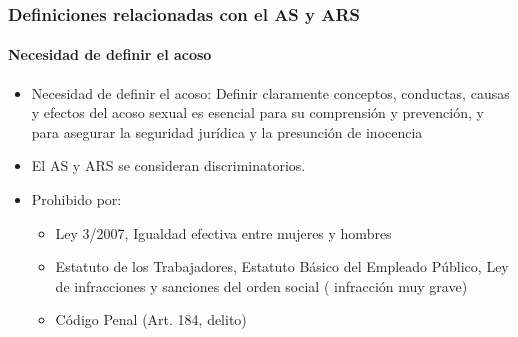 \documentclass{beamer}
\newcommand{\highlight}[1]{{\color{Blue} #1}}
\begin{document}
    \begin{frame}
        \frametitle{Definiciones relacionadas con el AS y ARS}
        \framesubtitle{Necesidad de definir el acoso}
        \begin{itemize}
            \item \highlight{Necesidad de definir} el acoso: Definir claramente conceptos, conductas, causas y efectos del acoso sexual es esencial para su comprensión y prevención, y para asegurar la seguridad jurídica y la presunción de inocencia
            \item El AS y ARS se consideran \highlight{discriminatorios}.
            \item \highlight{Prohibido} por:
            \begin{itemize}
                \item Ley 3/2007, Igualdad efectiva entre mujeres y hombres
                \item Estatuto de los Trabajadores, Estatuto Básico del Empleado Público, Ley de infracciones y sanciones del orden social (\highlight{infracción muy grave})
                \item Código Penal (Art. 184, \highlight{delito})
            \end{itemize}
        \end{itemize}
    \end{frame}
\end{document}

